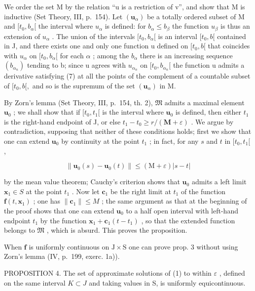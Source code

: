 We order the set M by the relation ``u is a restriction of v'', and show that M is inductive (Set Theory, III, p.~154). Let \((\mathbf{u}_{\alpha})\) be a totally ordered subset of M and \([t_{0}, b_{\alpha}[\) the interval where \(u_{\alpha}\) is defined: for \(b_{\alpha} \leqslant b_{\beta}\) the function \(u_{\beta}\) is thus an extension of \(u_{\alpha}\) . The union of the intervals \([t_{0}, b_{\alpha}[\) is an interval \([t_{0}, b[\) contained in J, and there exists one and only one function u defined on \([t_{0}, b[\) that coincides with \(u_{\alpha}\) on \([t_{0}, b_{\alpha}[\) for each \(\alpha\) ; among the \(b_{\alpha}\) there is an increasing sequence \((b_{\alpha_{n}})\) tending to b; since u agrees with \(u_{\alpha_{n}}\) on \([t_{0}, b_{\alpha_{n}}[\) the function u admits a derivative satisfying (7) at all the points of the complement of a countable subset of \([t_{0}, b[,\) and so is the supremum of the set \((\mathbf{u}_{\alpha})\) in M.

By Zorn's lemma (Set Theory, III, p.~154, th. 2), \(\mathfrak{M}\) admits a maximal element \(\mathbf{u}_0\) ; we shall show that if \([t_0, t_1[\) is the interval where \(\mathbf{u}_0\) is defined, then either \(t_1\) is the right-hand endpoint of J, or else \(t_1 - t_0 \geqslant r / (\mathbf{M} + \varepsilon)\) . We argue by contradiction, supposing that neither of these conditions holds; first we show that one can extend \(\mathbf{u}_0\) by continuity at the point \(t_1\) ; in fact, for any \(s\) and \(t\) in \([t_0, t_1[\) ,

\[
\left\| \mathbf {u} _ {0} (s) - \mathbf {u} _ {0} (t) \right\| \leqslant (\mathrm{M} + \varepsilon) | s - t |
\]

by the mean value theorem; Cauchy's criterion shows that \(\mathbf{u}_0\) admits a left limit \(\mathbf{x}_1 \in S\) at the point \(t_1\) . Now let \(\mathbf{c}_1\) be the right limit at \(t_1\) of the function \(\mathbf{f}(t, \mathbf{x}_1)\) ; one has \(\| \mathbf{c}_1 \| \leqslant M\) ; the same argument as that at the beginning of the proof shows that one can extend \(\mathbf{u}_0\) to a half open interval with left-hand endpoint \(t_1\) by the function \(\mathbf{x}_1 + \mathbf{c}_1 (t - t_1)\) , so that the extended function belongs to \(\mathfrak{M}\) , which is absurd. This proves the proposition.

When \(\mathbf{f}\) is uniformly continuous on \(\mathrm{J} \times \mathrm{S}\) one can prove prop. 3 without using Zorn's lemma (IV, p.~199, exerc. 1a)).

PROPOSITION 4. The set of approximate solutions of (1) to within \(\varepsilon\) , defined on the same interval \(K \subset J\) and taking values in S, is uniformly equicontinuous.

